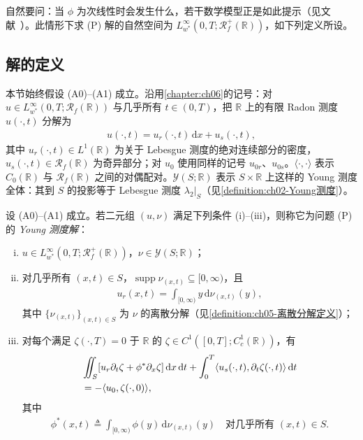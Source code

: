﻿\documentclass[../../main.tex]{subfiles}%
\begin{document}
自然要问：当 $\phi$ 为次线性时会发生什么，若干数学模型正是如此提示（见文献~\cite{ref50,ref88,ref89}）。此情形下求 (P) 解的自然空间为 $L^\infty_{w^*}(0,T;\mathscr{R}_f^+(\mathbb{R}))$，如下列定义所设。

\subsection{解的定义}\label{subsection:ch07-解的定义}

本节始终假设 (A0)--(A1) 成立。沿用\cref{chapter:ch06}的记号：对 $u\in L^\infty_{w^*}(0,T;\mathscr{R}_f(\mathbb{R}))$ 与几乎所有 $t\in(0,T)$，把 $\mathbb{R}$ 上的有限 Radon 测度 $u(\cdot,t)$ 分解为
\begin{align*}
u(\cdot,t)=u_r(\cdot,t)\,\mathrm{d}x+u_s(\cdot,t),
\end{align*}
其中 $u_r(\cdot,t)\in L^1(\mathbb{R})$ 为关于 Lebesgue 测度的绝对连续部分的密度，$u_s(\cdot,t)\in\mathscr{R}_f(\mathbb{R})$ 为奇异部分；对 $u_0$ 使用同样的记号 $u_{0r}$、$u_{0s}$。$\langle\cdot,\cdot\rangle$ 表示 $C_0(\mathbb{R})$ 与 $\mathscr{R}_f(\mathbb{R})$ 之间的对偶配对。$\mathcal{Y}(S;\mathbb{R})$ 表示 $S\times\mathbb{R}$ 上这样的 Young 测度全体：其到 $S$ 的投影等于 Lebesgue 测度 $\lambda_2|_S$（见\cref{definition:ch02-Young测度}）。

\begin{definition}\label{definition:ch07-young测度解}
设 (A0)--(A1) 成立。若二元组 $(u,\nu)$ 满足下列条件 (i)--(iii)，则称它为问题 (P) 的 \emph{Young 测度解}：
\begin{enumerate}[(i)]
\item $u\in L^\infty_{w^*}(0,T;\mathscr{R}_f^+(\mathbb{R}))$，$\nu\in\mathcal{Y}(S;\mathbb{R})$；
\item 对几乎所有 $(x,t)\in S$，$\operatorname{supp}\nu_{(x,t)}\subseteq[0,\infty)$，且
\begin{align}
u_r(x,t)=\int_{[0,\infty)}y\,\mathrm{d}\nu_{(x,t)}(y), \label{align:ch07-7.2}
\end{align}
其中 $\{\nu_{(x,t)}\}_{(x,t)\in S}$ 为 $\nu$ 的离散分解（见\cref{definition:ch05-离散分解定义}）；
\item 对每个满足 $\zeta(\cdot,T)=0$ 于 $\mathbb{R}$ 的 $\zeta\in C^1([0,T];C_c^1(\mathbb{R}))$，有
\begin{align}
&\iint_S[u_r\partial_t\zeta+\phi^*\partial_x\zeta]\,\mathrm{d}x\,\mathrm{d}t
+\int_0^T\langle u_s(\cdot,t),\partial_t\zeta(\cdot,t)\rangle\,\mathrm{d}t\notag\\
&=-\langle u_0,\zeta(\cdot,0)\rangle, \label{align:ch07-7.3}
\end{align}
其中
\begin{align}
\phi^*(x,t)\triangleq\int_{[0,\infty)}\phi(y)\,\mathrm{d}\nu_{(x,t)}(y)
\quad\text{对几乎所有 }(x,t)\in S. \label{align:ch07-7.4}
\end{align}
\end{enumerate}
\end{definition}
\end{document}
